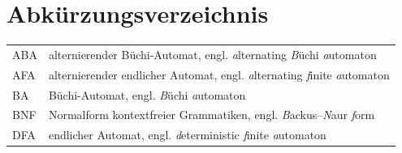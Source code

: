 
\cleardoublepage
{}
{}
\chapter*{Abkürzungsverzeichnis}
\label{section-abbrevs}

\noindent\begin{tabularx}{0.96\textwidth}{@{}p{2.2cm}X@{}}
  ABA & alternierender Büchi-Automat, engl. \emph{a}lternating \emph{B}üchi \emph{a}utomaton\\
  AFA & alternierender endlicher Automat, engl. \emph{a}lternating \emph{f}inite \emph{a}utomaton\\
  BA & Büchi-Automat, engl. \emph{B}üchi \emph{a}utomaton\\
  BNF & Normalform kontextfreier Grammatiken, engl. \emph{B}ackus--\emph{N}aur \emph{f}orm\\
  DFA & endlicher Automat, engl. \emph{d}eterministic \emph{f}inite \emph{a}utomaton
\end{tabularx}
